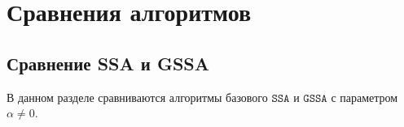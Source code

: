 \documentclass[12pt, specialist, subf
]{disser}
\theoremstyle{definition}
\newcommand{\SSA}{\texttt{SSA}}
\newcommand{\GSSA}{\texttt{GSSA}}
\newtheorem{theorem}{Теорема} %
\begin{document}






\newpage




\chapter{Сравнения алгоритмов}
\label{chapter:comparison}


\section{Сравнение SSA и GSSA}
\label{sec:compare_ssa_gssa}
В данном разделе сравниваются алгоритмы базового $\SSA$ и $\GSSA$ с параметром $\alpha \not = 0$. 
\end{document}
